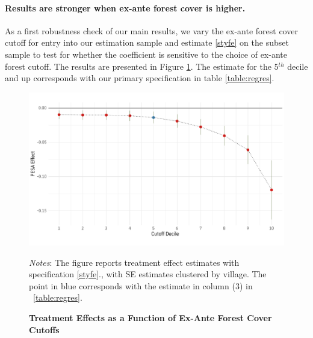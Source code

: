 \documentclass[12pt,reqno]{article}
\begin{document}
\paragraph*{Results are stronger when ex-ante forest cover is higher.} As a first robustness check of our main results, we vary the ex-ante forest cover cutoff for entry into our estimation sample and estimate \ref{styfe}
on the subset sample to test for whether the coefficient is sensitive to the choice of ex-ante forest cutoff. The results are presented in Figure
\ref{fig:cutoff_plot}. The estimate for the 5$^{th}$ decile and up corresponds with our primary specification in table \ref{table:regres}.


\begin{figure}[htbp!]
\begin{center}
\begin{minipage}{1 \linewidth}
\caption{\textbf{Treatment Effects as a Function of Ex-Ante Forest Cover Cutoffs}\label{fig:cutoff_plot}} 	
\centerline{\includegraphics[width=5 in,angle=0]{Output/varying_cutoff2.pdf}}
\smallskip
\scriptsize
\emph{Notes}: The figure reports treatment effect estimates with specification \ref{styfe}., with SE estimates clustered by village. The point in blue corresponds with the estimate in column (3) in ~\ref{table:regres}. 
\end{minipage}
\end{center}
\end{figure}
\end{document}
